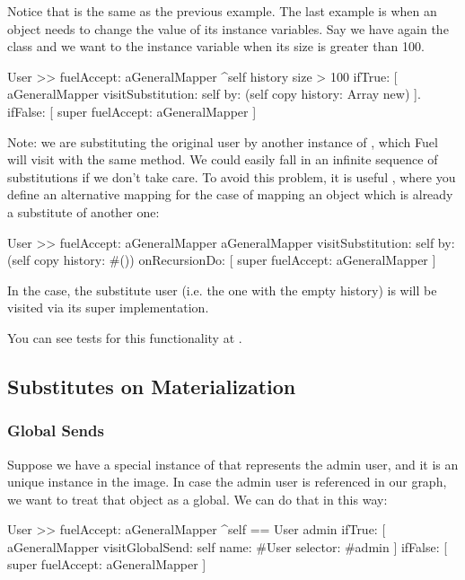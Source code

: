 \documentclass[a4paper,10pt,twoside]{book}
\begin{document}
Notice that  is the same as the previous example. The last example is when an object needs to change the value of its instance variables. Say we have again the class  and we want to  the instance variable  when its size is greater than 100. 

\begin{code}
User >> fuelAccept: aGeneralMapper
    ^self history size > 100 
        ifTrue: [ 
            aGeneralMapper 
                visitSubstitution: self 
                by: (self copy history: Array new) ].
        ifFalse: [ super fuelAccept: aGeneralMapper ]
\end{code}

Note: we are substituting the original user by another instance of , which Fuel will visit with the same  method. We could easily fall in an infinite sequence of substitutions if we don't take care. To avoid this problem, it is useful , where you define an alternative mapping for the case of mapping an object which is already a substitute of another one:

\begin{code}
User >> fuelAccept: aGeneralMapper
    aGeneralMapper 
        visitSubstitution: self 
        by: (self copy history: #())
        onRecursionDo: [ super fuelAccept: aGeneralMapper ]
\end{code}

In the case, the substitute user (i.e. the one with the empty history) is will be visited via its super implementation.

You can see tests for this functionality at .


\subsection{Substitutes on Materialization}


\subsubsection{Global Sends}

Suppose we have a special instance of  that represents the admin user, and it is an unique instance in the image. In case the admin user is referenced in our graph, we want to treat that object as a global. We can do that in this way:

\begin{code}
User >> fuelAccept: aGeneralMapper
    ^self == User admin
        ifTrue: [ 
            aGeneralMapper 
                visitGlobalSend: self 
                name: #User 
                selector: #admin ]
        ifFalse: [ super fuelAccept: aGeneralMapper ]
\end{code}
\end{document}
